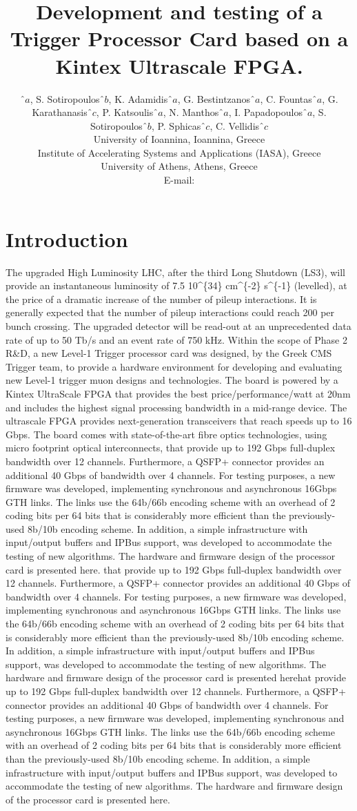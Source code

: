 \documentclass[a4paper]{PoS}
\title{Development and testing of a Trigger Processor Card based on a Kintex Ultrascale FPGA.}
\author{\speaker{S. Mallios}$ˆa$, S. Sotiropoulos$ˆ{b}$, K. Adamidis$ˆa$, G. Bestintzanos$ˆa$, C. Fountas$ˆa$, G. Karathanasis$ˆc$, P. Katsoulis$ˆa$, N. Manthos$ˆa$, I. Papadopoulos$ˆa$, S. Sotiropoulos$ˆb$, P. Sphicas$ˆc$, C. Vellidis$ˆc$\\
\llap{$ˆa$} University of Ioannina, Ioannina, Greece\\
\llap{$ˆb$} Institute of Accelerating Systems and Applications (IASA), Greece\\
\llap{$ˆc$} University of Athens, Athens, Greece\\
E-mail: \email{stavros.mallios@cern.ch@mail.org}}
\begin{document}

\section{Introduction}
The upgraded High Luminosity LHC, after the third Long Shutdown (LS3), will provide an instantaneous luminosity of 7.5 10\^{}\{34\} cm\^{}\{-2\} s\^{}\{-1\} (levelled), at the price of a dramatic increase of the number of pileup interactions. It is generally expected that the number of pileup interactions could reach 200 per bunch crossing. The upgraded detector will be read-out at an unprecedented data rate of up to 50 Tb/s and an event rate of 750 kHz. Within the scope of Phase 2 R\&D, a new Level-1 Trigger processor card was designed, by the Greek CMS Trigger team, to provide a hardware environment for developing and evaluating new Level-1 trigger muon designs and technologies. The board is powered by a Kintex UltraScale FPGA that provides the best price/performance/watt at 20nm and includes the highest signal processing bandwidth in a mid-range device. The ultrascale FPGA provides next-generation transceivers that reach speeds up to 16 Gbps. The board comes with state-of-the-art fibre optics technologies, using micro footprint optical interconnects, that provide up to 192 Gbps full-duplex bandwidth over 12 channels. Furthermore, a QSFP+ connector provides an additional 40 Gbps of bandwidth over 4 channels. For testing purposes, a new firmware was developed, implementing synchronous and asynchronous 16Gbps GTH links. The links use the 64b/66b encoding scheme with an overhead of 2 coding bits per 64 bits that is considerably more efficient than the previously-used 8b/10b encoding scheme. In addition, a simple infrastructure with input/output buffers and IPBus support, was developed to accommodate the testing of new algorithms. The hardware and firmware design of the processor card is presented here. that provide up to 192 Gbps full-duplex bandwidth over 12 channels. Furthermore, a QSFP+ connector provides an additional 40 Gbps of bandwidth over 4 channels. For testing purposes, a new firmware was developed, implementing synchronous and asynchronous 16Gbps GTH links. The links use the 64b/66b encoding scheme with an overhead of 2 coding bits per 64 bits that is considerably more efficient than the previously-used 8b/10b encoding scheme. In addition, a simple infrastructure with input/output buffers and IPBus support, was developed to accommodate the testing of new algorithms. The hardware and firmware design of the processor card is presented herehat provide up to 192 Gbps full-duplex bandwidth over 12 channels. Furthermore, a QSFP+ connector provides an additional 40 Gbps of bandwidth over 4 channels. For testing purposes, a new firmware was developed, implementing synchronous and asynchronous 16Gbps GTH links. The links use the 64b/66b encoding scheme with an overhead of 2 coding bits per 64 bits that is considerably more efficient than the previously-used 8b/10b encoding scheme. In addition, a simple infrastructure with input/output buffers and IPBus support, was developed to accommodate the testing of new algorithms. The hardware and firmware design of the processor card is presented here.
\end{document}
